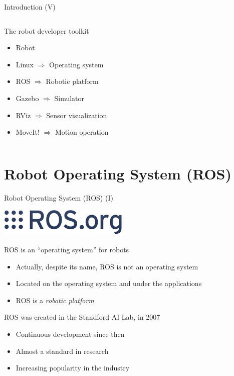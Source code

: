 \documentclass[10pt,compress]{beamer} %
\begin{document}
\begin{frame}{Introduction (V)}
	\begin{columns}
	 	\begin{block}{The robot developer toolkit}
		\begin{itemize}
		\item Robot
		\item Linux $\Rightarrow$ Operating system
		\item ROS $\Rightarrow$ Robotic platform
		\item Gazebo $\Rightarrow$ Simulator
		\item RViz $\Rightarrow$ Sensor visualization
		\item MoveIt! $\Rightarrow$ Motion operation
		\end{itemize}
	\end{block}
	\end{columns}
\end{frame}

\section{Robot Operating System (ROS)}
\begin{frame}{Robot Operating System (ROS) (I)}
\begin{center}
	\includegraphics[width=0.25\linewidth]{figs/ros.png}\\
\end{center}
	ROS is an ``operating system'' for robots 
	\begin{itemize}
		\item Actually, despite its name, ROS is not an operating system
		\item Located on the operating system and under the applications
		\item ROS is a \textit{robotic platform}
	\end{itemize}
	ROS was created in the Standford AI Lab, in 2007
	\begin{itemize}
		\item Continuous development since then
		\item Almost a standard in research
		\item Increasing popularity in the industry
	\end{itemize}
\end{frame}
\end{document}
